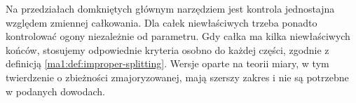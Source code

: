 Na przedziałach domkniętych głównym narzędziem jest kontrola jednostajna względem zmiennej całkowania. Dla całek niewłaściwych trzeba ponadto kontrolować ogony niezależnie od parametru. Gdy całka ma kilka niewłaściwych końców, stosujemy odpowiednie kryteria osobno do każdej części, zgodnie z definicją \ref{ma1:def:improper-splitting}. Wersje oparte na teorii miary, w tym twierdzenie o zbieżności zmajoryzowanej, mają szerszy zakres i nie są potrzebne w podanych dowodach.
